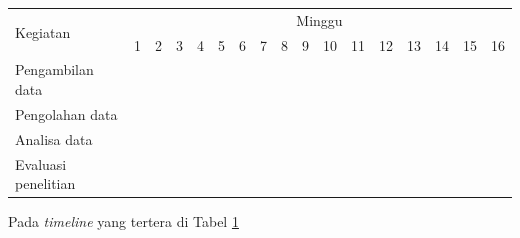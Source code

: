 \newcommand{\w}{}
\newcommand{\G}{\cellcolor{gray}}
\begin{table}[h!]
  \begin{tabular}{|p{3.5cm}|c|c|c|c|c|c|c|c|c|c|c|c|c|c|c|c|}

    \hline
    \multirow{2}{*}{Kegiatan} & \multicolumn{16}{|c|}{Minggu} \\
    \cline{2-17} &
    1 & 2 & 3 & 4 & 5 & 6 & 7 & 8 & 9 & 10 & 11 & 12 & 13 & 14 & 15 & 16 \\
    \hline

    Pengambilan data &
    \G & \G & \G & \G & \w & \w & \w & \w & \w & \w & \w & \w & \w & \w & \w & \w \\
    \hline

    Pengolahan data &
    \w & \w & \w & \w & \G & \G & \G & \G & \w & \w & \w & \w & \w & \w & \w & \w \\
    \hline

    Analisa data &
    \w & \w & \w & \w & \w & \w & \w & \w & \G & \G & \G & \G & \w & \w & \w & \w \\
    \hline

    Evaluasi penelitian &
    \w & \w & \w & \w & \w & \w & \w & \w & \w & \w & \w & \w & \G & \G & \G & \G \\
    \hline

  \end{tabular}
  \label{tbl:timeline}
\end{table}

Pada \emph{timeline} yang tertera di Tabel \ref{tbl:timeline} \lipsum[10]
